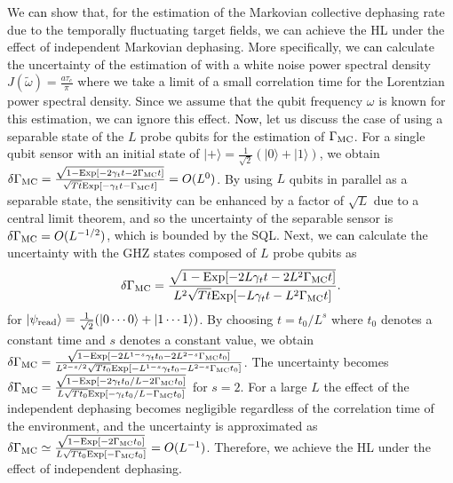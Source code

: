 \documentclass[prl,twocolumn,superscriptaddress]{revtex4}
\begin{document}
We \textcolor{black}{can} show that, for the estimation of the Markovian collective dephasing rate due to the
temporally fluctuating target fields, we can achieve the
HL
under the effect of independent Markovian dephasing.
More specifically, we \textcolor{black}{can} calculate the uncertainty of the estimation of
with a white noise  power spectral density $J(\tilde{\omega} )=\frac{a\tau _c}{\pi
}$ where we take a limit of a small correlation time for the Lorentzian
power spectral density. 
 Since we assume that the qubit frequency $\omega $ is known for this
 estimation, we can ignore this effect.
 \textcolor{black}{Now,}
 let us discuss the case of using a separable state of
 the $L$ probe qubits for the estimation of $\Gamma _{\rm{MC}}$.
For a single qubit sensor with an initial state of $|+\rangle
 =\frac{1}{\sqrt{2}}(|0\rangle +|1\rangle )$, we obtain
$ \delta \Gamma _{\rm{MC}}=\frac{\sqrt{1- {\rm{Exp}}[-2\gamma _tt-2\Gamma_{\rm{MC}}t
 ]}}{\sqrt{Tt}{\rm{Exp}}[-\gamma _tt-\Gamma_{\rm{MC}}t ]}=O(L^0)$.
 By using $L$ qubits in
 parallel as a separable state,
 the sensitivity can be enhanced by a factor of $\sqrt{L}$ due to a
 central limit theorem, and so the uncertainty of the separable sensor
 is $\delta \Gamma
 _{\rm{MC}}=O(L^{-1/2})$, which is bounded by the SQL.
Next, we \textcolor{black}{can} calculate the uncertainty 
with the GHZ states composed of $L$ probe qubits as
\begin{eqnarray}
 \delta \Gamma _{\rm{MC}}=\frac{\sqrt{1- {\rm{Exp}}[-2L\gamma _tt-2L^2\Gamma_{\rm{MC}}t
 ]}}{L^2\sqrt{Tt}{\rm{Exp}}[-L\gamma _tt-L^2\Gamma_{\rm{MC}}t ]}.\label{mcrate}
\end{eqnarray}
for $|\psi _{\rm{read}}\rangle =\frac{1}{\sqrt{2}}(|0\cdots
0\rangle +|1\cdots 1\rangle )$.
  By choosing $t=t_0 /L^s$
 where $t_0$ denotes a constant time and $s$ denotes a constant value,
 we obtain $\delta \Gamma
 _{\rm{MC}}=\frac{\sqrt{1- {\rm{Exp}}[-2L^{1-s}\gamma _tt_0-2L^{2-s}\Gamma_{\rm{MC}}t_0
 ]}}{L^{2-s/2}\sqrt{Tt_0}{\rm{Exp}}[-L^{1-s}\gamma _tt_0-L^{2-s}\Gamma_{\rm{MC}}t_0 ]}$.
 The uncertainty becomes $\delta \Gamma
 _{\rm{MC}}=\frac{\sqrt{1- {\rm{Exp}}[-2\gamma _tt_0/L-2\Gamma_{\rm{MC}}t_0
 ]}}{L\sqrt{Tt_0}{\rm{Exp}}[-\gamma _tt_0/L-\Gamma_{\rm{MC}}t_0 ]}$ for $s=2$.
For a large $L$ the effect of the independent 
 dephasing becomes negligible regardless of the correlation time of the environment, and the uncertainty is approximated as $\delta \Gamma
 _{\rm{MC}}\simeq \frac{\sqrt{1- {\rm{Exp}}[-2\Gamma_{\rm{MC}}t_0
 ]}}{L\sqrt{Tt_0}{\rm{Exp}}[-\Gamma_{\rm{MC}}t_0 ]}=O(L^{-1})$. 
 Therefore, we achieve the
 HL
 under the effect of independent dephasing.
\end{document}
